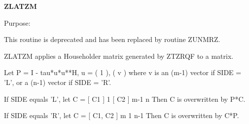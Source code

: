 {\bfseries Z\+L\+A\+T\+Z\+M} 

 \begin{DoxyParagraph}{Purpose\+: }
\begin{DoxyVerb} This routine is deprecated and has been replaced by routine ZUNMRZ.

 ZLATZM applies a Householder matrix generated by ZTZRQF to a matrix.

 Let P = I - tau*u*u**H,   u = ( 1 ),
                               ( v )
 where v is an (m-1) vector if SIDE = 'L', or a (n-1) vector if
 SIDE = 'R'.

 If SIDE equals 'L', let
        C = [ C1 ] 1
            [ C2 ] m-1
              n
 Then C is overwritten by P*C.

 If SIDE equals 'R', let
        C = [ C1, C2 ] m
               1  n-1
 Then C is overwritten by C*P.\end{DoxyVerb}
 
\end{DoxyParagraph}

